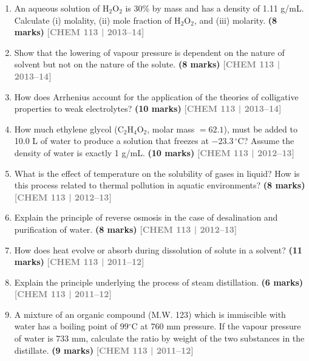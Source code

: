 \documentclass[12pt,a3paper]{article}
\newcommand{\yr}[1]{\hfill\textcolor{gray}{\small\textbf{[#1]}}}
\newcommand{\mk}[1]{\textcolor{orange!70!black}{\small\textbf{(#1 marks)}}}
\begin{document}
\begin{enumerate}
\item An aqueous solution of H$_2$O$_2$ is 30\% by mass and has a density of 1.11 g/mL. Calculate (i) molality, (ii) mole fraction of H$_2$O$_2$, and (iii) molarity. \mk{8}
\yr{CHEM 113 | 2013--14}



\item Show that the lowering of vapour pressure is dependent on the nature of solvent but not on the nature of the solute. \mk{8}
\yr{CHEM 113 | 2013--14}



\item How does Arrhenius account for the application of the theories of colligative properties to weak electrolytes? \mk{10}
\yr{CHEM 113 | 2013--14}



\item How much ethylene glycol (C$_2$H$_4$O$_2$, molar mass $= 62.1$), must be added to 10.0 L of water to produce a solution that freezes at $-23.3\,^\circ$C? Assume the density of water is exactly 1 g/mL. \mk{10}
\yr{CHEM 113 | 2012--13}



\item What is the effect of temperature on the solubility of gases in liquid? How is this process related to thermal pollution in aquatic environments? \mk{8}
\yr{CHEM 113 | 2012--13}



\item Explain the principle of reverse osmosis in the case of desalination and purification of water. \mk{8}
\yr{CHEM 113 | 2012--13}



\item How does heat evolve or absorb during dissolution of solute in a solvent? \mk{11}
\yr{CHEM 113 | 2011--12}



\item Explain the principle underlying the process of steam distillation. \mk{6}
\yr{CHEM 113 | 2011--12}



\item A mixture of an organic compound (M.W. 123) which is immiscible with water has a boiling point of 99$^\circ$C at 760 mm pressure. If the vapour pressure of water is 733 mm, calculate the ratio by weight of the two substances in the distillate. \mk{9}
\yr{CHEM 113 | 2011--12}




\end{enumerate}
\end{document}

